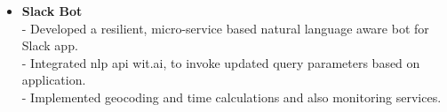\begin{itemize}
 \item \textbf{Slack Bot} \\
 - Developed a resilient, micro-service based natural language aware bot for Slack app.\\
 - Integrated nlp api wit.ai, to invoke updated query parameters based on application.\\
 - Implemented geocoding and time calculations and also monitoring services.





\end{itemize}
